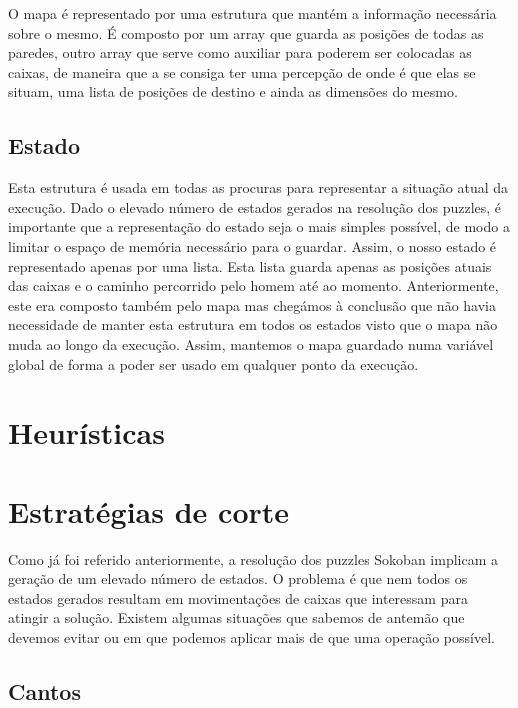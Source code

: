 \documentclass[twocolumn]{article}
\begin{document}
O mapa é representado por uma estrutura que mantém a informação necessária sobre o mesmo. É composto por um array que guarda as posições de todas as paredes, outro array que serve como auxiliar para poderem ser colocadas as caixas, de maneira que a se consiga ter uma percepção de onde é que elas se situam, uma lista de posições de destino e ainda as dimensões do mesmo.

\subsection{Estado}

Esta estrutura é usada em todas as procuras para representar a situação atual da execução. Dado o elevado número de estados gerados na resolução dos puzzles, é importante que a representação do estado seja o mais simples possível, de modo a limitar o espaço de memória necessário para o guardar. Assim, o nosso estado é representado apenas por uma lista. Esta lista guarda apenas as posições atuais das caixas e o caminho percorrido pelo homem até ao momento. Anteriormente, este era composto também pelo mapa mas chegámos à conclusão que não havia necessidade de manter esta estrutura em todos os estados visto que o mapa não muda ao longo da execução. Assim, mantemos o mapa guardado numa variável global de forma a poder ser usado em qualquer ponto da execução.

\section{Heurísticas}

\section{Estratégias de corte}

Como já foi referido anteriormente, a resolução dos puzzles Sokoban implicam a geração de um elevado número de estados. O problema é que nem todos os estados gerados resultam em movimentações de caixas que interessam para atingir a solução. Existem algumas situações que sabemos de antemão que devemos evitar ou em que podemos aplicar mais de que uma operação possível.

\subsection{Cantos}
\end{document}
